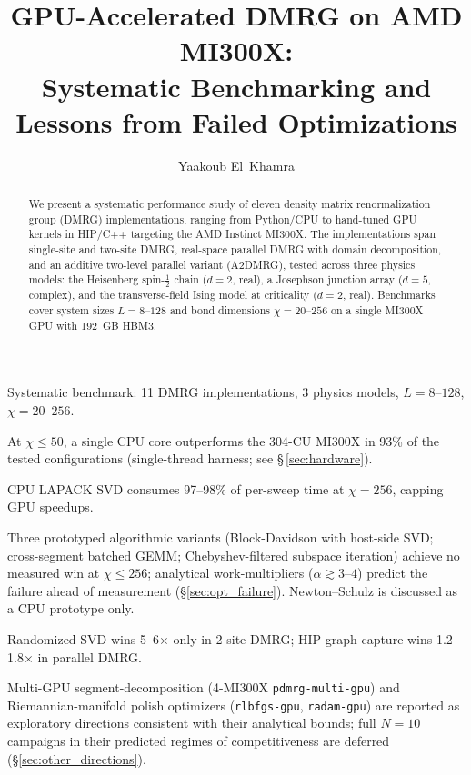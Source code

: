 \documentclass[preprint,12pt]{elsarticle}
\begin{document}
\begin{frontmatter}

\title{GPU-Accelerated DMRG on AMD MI300X:\\Systematic Benchmarking and Lessons from Failed Optimizations}

\author[inst1]{Yaakoub El~Khamra}

\begin{highlights}
\item Systematic benchmark: 11 DMRG implementations, 3 physics models, $L{=}8$--$128$, $\chi{=}20$--$256$.
\item At $\chi{\leq}50$, a single CPU core outperforms the 304-CU MI300X in 93\% of the tested configurations (single-thread harness; see \S\,\ref{sec:hardware}).
\item CPU LAPACK SVD consumes 97--98\% of per-sweep time at $\chi{=}256$, capping GPU speedups.
\item Three prototyped algorithmic variants (Block-Davidson with host-side SVD; cross-segment batched GEMM; Chebyshev-filtered subspace iteration) achieve no measured win at $\chi{\leq}256$; analytical work-multipliers ($\alpha \gtrsim 3$--$4$) predict the failure ahead of measurement (\S\ref{sec:opt_failure}). Newton--Schulz is discussed as a CPU prototype only.
\item Randomized SVD wins 5--6$\times$ only in 2-site DMRG; HIP graph capture wins 1.2--1.8$\times$ in parallel DMRG.
\item Multi-GPU segment-decomposition (4-MI300X \texttt{pdmrg-multi-gpu}) and Riemannian-manifold polish optimizers (\texttt{rlbfgs-gpu}, \texttt{radam-gpu}) are reported as exploratory directions consistent with their analytical bounds; full $N{=}10$ campaigns in their predicted regimes of competitiveness are deferred (\S\ref{sec:other_directions}).
\end{highlights}

\begin{abstract}
We present a systematic performance study of eleven density matrix renormalization group (DMRG) implementations, ranging from Python/CPU to hand-tuned GPU kernels in HIP/C++ targeting the AMD Instinct MI300X.
The implementations span single-site and two-site DMRG, real-space parallel DMRG with domain decomposition, and an additive two-level parallel variant (A2DMRG), tested across three physics models: the Heisenberg spin-$\frac{1}{2}$ chain ($d=2$, real), a Josephson junction array ($d=5$, complex), and the transverse-field Ising model at criticality ($d=2$, real).
Benchmarks cover system sizes $L = 8$--$128$ and bond dimensions $\chi = 20$--$256$ on a single MI300X GPU with 192~GB HBM3.


\end{abstract}
\end{frontmatter}
\end{document}
